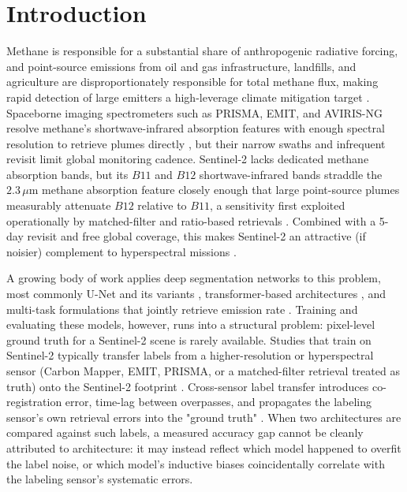 \documentclass[10pt,twocolumn]{article}
\begin{document}
\section{Introduction}
\label{sec:intro}

Methane is responsible for a substantial share of anthropogenic radiative forcing, and point-source emissions from oil and gas infrastructure, landfills, and agriculture are disproportionately responsible for total methane flux, making rapid detection of large emitters a high-leverage climate mitigation target \citep{pandey2022global,karimi2025advanced}. Spaceborne imaging spectrometers such as PRISMA, EMIT, and AVIRIS-NG resolve methane's shortwave-infrared absorption features with enough spectral resolution to retrieve plumes directly \citep{joyce2023deep,irakulisloitxate2022prisma,kumar2023methanemapper}, but their narrow swaths and infrequent revisit limit global monitoring cadence. Sentinel-2 lacks dedicated methane absorption bands, but its $B11$ and $B12$ shortwave-infrared bands straddle the $2.3\,\mu$m methane absorption feature closely enough that large point-source plumes measurably attenuate $B12$ relative to $B11$, a sensitivity first exploited operationally by matched-filter and ratio-based retrievals \citep{varon2021highfrequency,gorrono2023understanding,wang2024exploiting,gorrono2024ch4net}. Combined with a 5-day revisit and free global coverage, this makes Sentinel-2 an attractive (if noisier) complement to hyperspectral missions \citep{drusch2012sentinel2}.

A growing body of work applies deep segmentation networks to this problem, most commonly U-Net and its variants \citep{ruzicka2023starcop,heckman2020deep,dubaret2023methaneunet,li2025mpsunet,bhattacharya2024prismethanet,zhang2025learnable,mohammadi2025foundation,martinez2025attmetnet}, transformer-based architectures \citep{kumar2023methanemapper}, and multi-task formulations that jointly retrieve emission rate \citep{jiang2024unlocking,sherwin2025plumebed}. Training and evaluating these models, however, runs into a structural problem: pixel-level ground truth for a Sentinel-2 scene is rarely available. Studies that train on Sentinel-2 typically transfer labels from a higher-resolution or hyperspectral sensor (Carbon Mapper, EMIT, PRISMA, or a matched-filter retrieval treated as truth) onto the Sentinel-2 footprint \citep{mateogarcia2023s2metnet,sherwin2025plumebed,mateogarcia2025multiplatform}. Cross-sensor label transfer introduces co-registration error, time-lag between overpasses, and propagates the labeling sensor's own retrieval errors into the "ground truth" \citep{gorrono2023singleblind,varon2024singleblind}. When two architectures are compared against such labels, a measured accuracy gap cannot be cleanly attributed to architecture: it may instead reflect which model happened to overfit the label noise, or which model's inductive biases coincidentally correlate with the labeling sensor's systematic errors.
\end{document}
